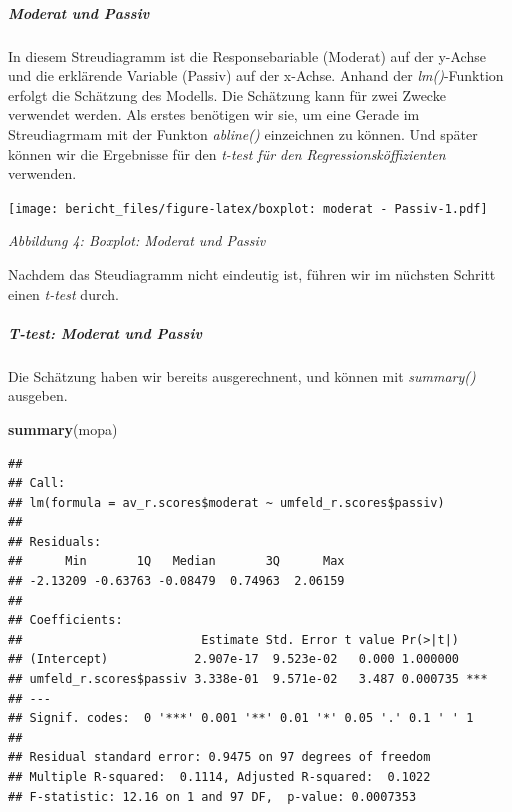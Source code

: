 \documentclass[]{article}
\newenvironment{Shaded}{\begin{snugshade}}{\end{snugshade}}
\newcommand{\KeywordTok}[1]{\textcolor[rgb]{0.13,0.29,0.53}{\textbf{{#1}}}}
\newcommand{\DataTypeTok}[1]{\textcolor[rgb]{0.13,0.29,0.53}{{#1}}}
\newcommand{\StringTok}[1]{\textcolor[rgb]{0.31,0.60,0.02}{{#1}}}
\newcommand{\NormalTok}[1]{{#1}}
\let\oldsubparagraph\subparagraph
\renewcommand{\subparagraph}[1]{\oldsubparagraph{#1}\mbox{}}
\begin{document}
\subparagraph{Moderat und Passiv}\label{moderat-und-passiv}

In diesem Streudiagramm ist die Responsebariable (Moderat) auf der
y-Achse und die erklärende Variable (Passiv) auf der x-Achse. Anhand der
\emph{lm()}-Funktion erfolgt die Schätzung des Modells. Die Schätzung
kann für zwei Zwecke verwendet werden. Als erstes benötigen wir sie, um
eine Gerade im Streudiagrmam mit der Funkton \emph{abline()} einzeichnen
zu können. Und später können wir die Ergebnisse für den \emph{t-test für
den Regressionsköffizienten} verwenden.

\begin{Shaded}
\end{Shaded}

\texttt{[image: bericht\_files/figure-latex/boxplot: moderat - Passiv-1.pdf]}

\begin{center}
\textit{Abbildung 4: Boxplot: Moderat und Passiv}
\bigskip
\end{center}

Nachdem das Steudiagramm nicht eindeutig ist, führen wir im nüchsten
Schritt einen \emph{t-test} durch.

\subparagraph{T-test: Moderat und
Passiv}\label{t-test-moderat-und-passiv}

Die Schätzung haben wir bereits ausgerechnent, und können mit
\emph{summary()} ausgeben.

\begin{Shaded}
\begin{Highlighting}[]
\KeywordTok{summary}\NormalTok{(mopa)}
\end{Highlighting}
\end{Shaded}

\begin{verbatim}
## 
## Call:
## lm(formula = av_r.scores$moderat ~ umfeld_r.scores$passiv)
## 
## Residuals:
##      Min       1Q   Median       3Q      Max 
## -2.13209 -0.63763 -0.08479  0.74963  2.06159 
## 
## Coefficients:
##                         Estimate Std. Error t value Pr(>|t|)    
## (Intercept)            2.907e-17  9.523e-02   0.000 1.000000    
## umfeld_r.scores$passiv 3.338e-01  9.571e-02   3.487 0.000735 ***
## ---
## Signif. codes:  0 '***' 0.001 '**' 0.01 '*' 0.05 '.' 0.1 ' ' 1
## 
## Residual standard error: 0.9475 on 97 degrees of freedom
## Multiple R-squared:  0.1114, Adjusted R-squared:  0.1022 
## F-statistic: 12.16 on 1 and 97 DF,  p-value: 0.0007353
\end{verbatim}
\end{document}
